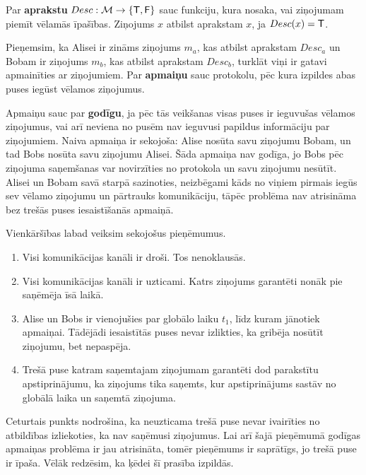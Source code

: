 Par \textbf{aprakstu} $Desc: \mathcal{M} \rightarrow \left\{ \textsf{T}, \textsf{F} \right\}$ sauc funkciju, kura nosaka, vai ziņojumam piemīt vēlamās īpašības. Ziņojums $x$ atbilst aprakstam $x$, ja $Desc(x) = \textsf{T}$.

Pieņemsim, ka Alisei ir zināms ziņojums $m_a$, kas atbilst aprakstam $Desc_a$ un Bobam ir ziņojums $m_b$, kas atbilst aprakstam $Desc_b$, turklāt viņi ir gatavi apmainīties ar ziņojumiem.
 Par \textbf{apmaiņu} sauc protokolu, pēc kura izpildes abas puses iegūst vēlamos ziņojumus. 

Apmaiņu sauc par \textbf{godīgu}, ja pēc tās veikšanas visas puses ir ieguvušas vēlamos ziņojumus, vai arī neviena no pusēm nav ieguvusi papildus informāciju par ziņojumiem.  Naiva apmaiņa ir sekojoša: Alise nosūta savu ziņojumu Bobam, un tad Bobs nosūta savu ziņojumu Alisei. Šāda apmaiņa nav godīga, jo Bobs pēc ziņojuma saņemšanas var novirzīties no protokola un savu ziņojumu nesūtīt. Alisei un Bobam savā starpā sazinoties, neizbēgami kāds no viņiem pirmais iegūs sev vēlamo ziņojumu un pārtrauks komunikāciju, tāpēc problēma nav atrisināma bez trešās puses iesaistīšanās apmaiņā.\cite{pagnia99}

Vienkāršības labad veiksim sekojošus pieņēmumus.
\begin{enumerate}
    \item Visi komunikācijas kanāli ir droši. Tos nenoklausās.
    \item Visi komunikācijas kanāli ir uzticami. Katrs ziņojums garantēti nonāk pie saņēmēja īsā laikā.
    \item Alise un Bobs ir vienojušies par globālo laiku $t_1$, līdz kuram jānotiek apmaiņai. Tādējādi iesaistītās puses nevar izlikties, ka gribēja nosūtīt ziņojumu, bet nepaspēja.
    \item Trešā puse katram saņemtajam ziņojumam garantēti dod parakstītu apstiprinājumu, ka ziņojums tika saņemts, kur apstiprinājums sastāv no globālā laika un saņemtā ziņojuma.
\end{enumerate}
Ceturtais punkts nodrošina, ka neuzticama trešā puse nevar ivairīties no atbildības izliekoties, ka nav saņēmusi ziņojumus. Lai arī šajā pieņēmumā godīgas apmaiņas problēma ir jau atrisināta, tomēr pieņēmums ir saprātīgs, jo trešā puse ir īpaša. Vēlāk redzēsim, ka ķēdei šī prasība izpildās.

